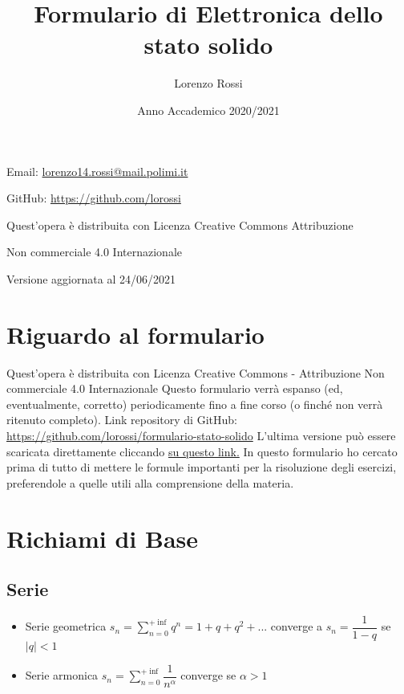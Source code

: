 \documentclass{article}
\title{\Huge Formulario di Elettronica dello stato solido}
\author{\LARGE Lorenzo Rossi}
\date{\LARGE Anno Accademico 2020/2021}
\begin{document}
\maketitle

\vspace{18em}

\large
\begin{doublespacing}\hypersetup{
    urlcolor=black,
  }
  \centerline{Email: \href{mailto://lorenzo14.rossi@mail.polimi.it}{lorenzo14.rossi@mail.polimi.it}}
  \centerline{GitHub: \url{https://github.com/lorossi}}

  \vspace{18em}
  \centerline{Quest'opera è distribuita con Licenza Creative Commons Attribuzione}
  \centerline{Non commerciale 4.0 Internazionale \ccbynceu}
  \centerline{Versione aggiornata al 24/06/2021}
\end{doublespacing}
\newpage


\tableofcontents
\clearpage
{}
\newpage

\section{Riguardo al formulario}
Quest'opera è distribuita con Licenza Creative Commons - Attribuzione Non commerciale 4.0 Internazionale \ccbynceu \newline
Questo formulario verrà espanso (ed, eventualmente, corretto) periodicamente fino a fine corso (o finché non verrà ritenuto completo). \newline
Link repository di GitHub: \url{https://github.com/lorossi/formulario-stato-solido} \newline
L'ultima versione può essere scaricata direttamente cliccando \href{https://github.com/lorossi/formulario-stato-solido/raw/master/formulario-elettronica-dello-stato-solido.pdf}{su questo link.} \newline
In questo formulario ho cercato prima di tutto di mettere le formule importanti per la risoluzione degli esercizi, preferendole a quelle utili alla comprensione della materia.

\bigskip

\section{Richiami di Base}
\subsection{Serie}
\begin{itemize}
  \item Serie geometrica \( \displaystyle  s_n = \sum_{n=0}^{+\inf} q^n = 1 + q + q^2 + ... \) converge a \( s_n = \dfrac{1}{1-q} \) se \( |q| < 1 \)
  \item Serie armonica \( \displaystyle s_n = \sum_{n=0}^{+\inf} \dfrac{1}{n ^ \alpha} \) converge se \( \alpha > 1 \)
\end{itemize}
\end{document}
